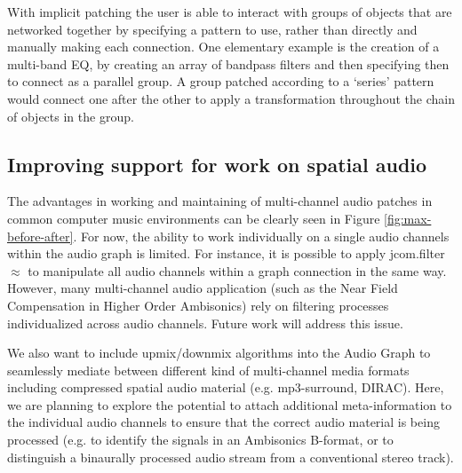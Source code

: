 \documentclass[twoside,a4paper]{article}
\begin{document}
With implicit patching the user is able to interact with groups of objects that are networked together by specifying a pattern to use, rather than directly and manually making each connection.  
One elementary example is the creation of a multi-band EQ, by creating an array of bandpass filters and then specifying then to connect as a parallel group.  
A group patched according to a `series' pattern would connect one after the other to apply a transformation throughout the chain of objects in the group.




\subsection{Improving support for work on spatial audio} %
The advantages in working and maintaining of multi-channel audio patches in common computer music environments can be clearly seen in Figure \ref{fig:max-before-after}. 
For now, the ability to work individually on a single audio channels within the audio graph is limited.
For instance, it is possible to apply jcom.filter$\approx$ to manipulate all audio channels within a graph connection in the same way. However, many multi-channel audio application (such as the Near Field Compensation in Higher Order Ambisonics) rely on filtering processes individualized across audio channels. Future work will address this issue.

We also want to include upmix/downmix algorithms into the Audio Graph to seamlessly mediate between different kind of multi-channel media formats including compressed spatial audio material (e.g. mp3-surround, DIRAC). Here, we are planning to explore the potential to attach additional meta-information to the individual audio channels to ensure that the correct audio material is being processed (e.g. to identify the signals in an Ambisonics B-format, or to distinguish a binaurally processed audio stream from a conventional stereo track). 
\end{document}

